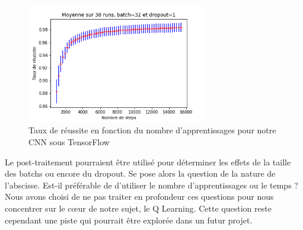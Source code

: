 \begin{figure}[h]
 \centering
 \includegraphics[width=0.7\textwidth]{img/tb_post_traitement.png}
 \caption{Taux de réussite en fonction du nombre d'apprentissages pour notre CNN sous TensorFlow}
 \label{fig:tb_post_traitement}
\end{figure}

Le post-traitement pourraient être utilisé pour déterminer les effets de la taille des batchs ou encore du dropout. Se pose alors la question de la nature de l’abscisse. Est-il préférable de d'utiliser le nombre d'apprentissages ou le temps ?
Nous avons choisi de ne pas traiter en profondeur ces questions pour nous concentrer sur le c\oe ur de notre sujet, le Q Learning. Cette question reste cependant une piste qui pourrait être explorée dans un futur projet.
